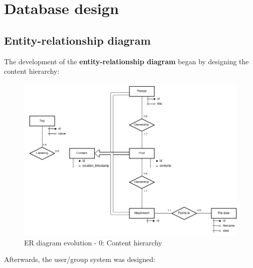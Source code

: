 \documentclass[12pt]{report}
\renewcommand\emph{\textbf}
\begin{document}
        \chapter{Database design}
            \section{Entity-relationship diagram}

                The development of the \emph{entity-relationship diagram} began by designing the content hierarchy:

                \begin{figure}[H]
                \caption{ER diagram evolution - 0: Content hierarchy}
                \centering
                \includegraphics[width=1\textwidth]{ernew/0}
                \end{figure}

                Afterwards, the user/group system was designed:
\end{document}
